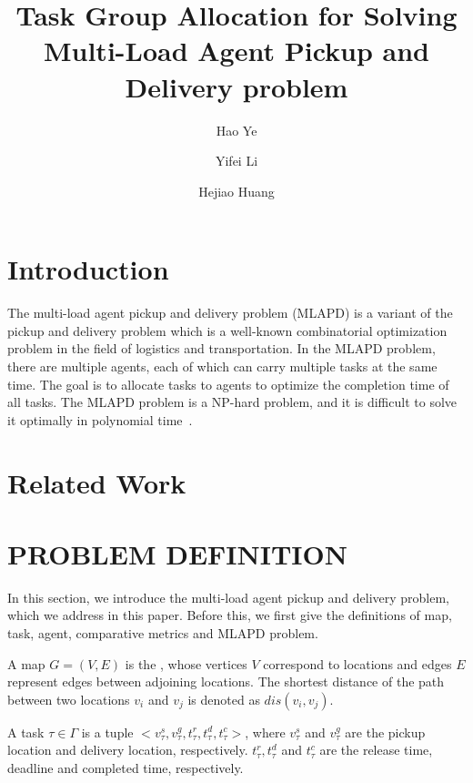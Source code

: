 \documentclass[sigconf,anonymous]{aamas}
\title[AAMAS-2025 Formatting Instructions]{Task Group Allocation for Solving Multi-Load Agent Pickup and Delivery problem}
\author{Hao Ye}
\affiliation{
  \institution{Harbin Institute of Technology (Shenzhen)}
  \city{Shenzhen}
  \country{China}}
\author{Yifei Li}
\affiliation{
  \institution{Harbin Institute of Technology (Shenzhen)}
  \city{Shenzhen}
  \country{China}}
\author{Hejiao Huang}
\affiliation{
  \institution{Harbin Institute of Technology (Shenzhen)}
  \city{Shenzhen}
  \country{China}}
\begin{document}

\pagestyle{fancy}
\fancyhead{}


\maketitle 

\section{Introduction}
The multi-load agent pickup and delivery problem (MLAPD) is a variant of the pickup and delivery problem
which is a well-known combinatorial optimization problem in the field of logistics and transportation.
In the MLAPD problem, there are multiple agents, each of which can carry multiple tasks at the same time.
The goal is to allocate tasks to agents to optimize the completion time of all tasks.
The MLAPD problem is a NP-hard problem, and it is difficult to solve it optimally in polynomial time~\cite{bai2022group}.

\section{Related Work}
\section{PROBLEM DEFINITION}
In this section, we introduce the multi-load agent pickup and delivery problem, 
which we address in this paper. 
Before this, we first give the definitions of map, task, agent, comparative metrics and MLAPD problem.

\begin{definition}[Map]
\label{MapDfn}
    A map $G = (V, E)$ is the , 
    whose vertices $V$ correspond to locations and edges $E$ represent edges between adjoining locations.
    The shortest distance of the path between two locations $v_{i}$ and $v_{j}$ is denoted as $dis(v_{i}, v_{j})$.

\end{definition}

\begin{definition}[Task]
\label{TaskDfn}
    A task $\tau \in \Gamma$ is a tuple 
    $<v^{s}_{\tau}, v^{g}_{\tau}, t^{r}_{\tau}, t^{d}_{\tau}, t^{c}_{\tau}>$, 
    where $v^{s}_{\tau}$ and $v^{g}_{\tau}$ are the pickup location and delivery location, respectively. 
    $t^{r}_{\tau}, t^{d}_{\tau}$ and $t^{c}_{\tau}$ are the release time, deadline and completed time, respectively.
\end{definition}
\end{document}
